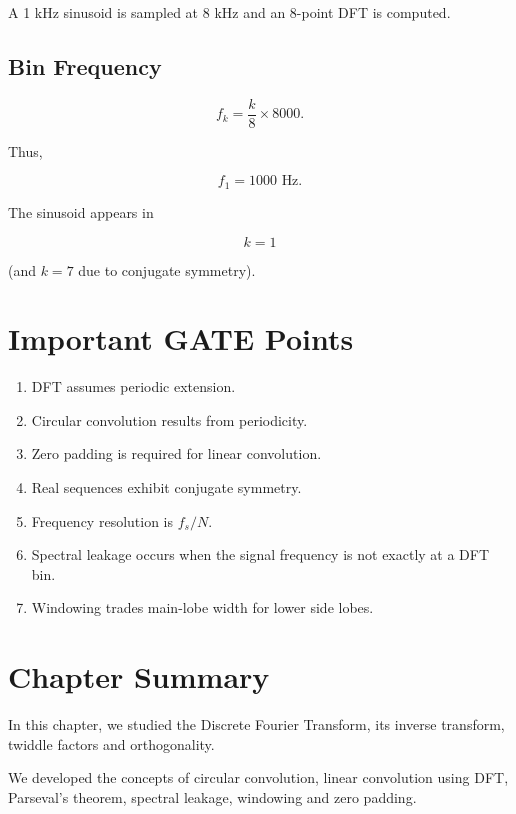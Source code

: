 A 1 kHz sinusoid is sampled at 8 kHz and an 8-point DFT is computed.


\subsection{Bin Frequency}

\[
f_k=\frac{k}{8}\times8000.
\]

Thus,

\[
f_1=1000\text{ Hz}.
\]

The sinusoid appears in

\[
\boxed{
k=1
}
\]

(and \(k=7\) due to conjugate symmetry).


\section{Important GATE Points}

\begin{enumerate}
\item DFT assumes periodic extension.
\item Circular convolution results from periodicity.
\item Zero padding is required for linear convolution.
\item Real sequences exhibit conjugate symmetry.
\item Frequency resolution is \(f_s/N\).
\item Spectral leakage occurs when the signal frequency is not exactly at a DFT bin.
\item Windowing trades main-lobe width for lower side lobes.
\end{enumerate}


\section{Chapter Summary}

In this chapter, we studied the Discrete Fourier Transform, its inverse transform,
twiddle factors and orthogonality.

We developed the concepts of circular convolution, linear convolution using DFT,
Parseval’s theorem, spectral leakage, windowing and zero padding.

